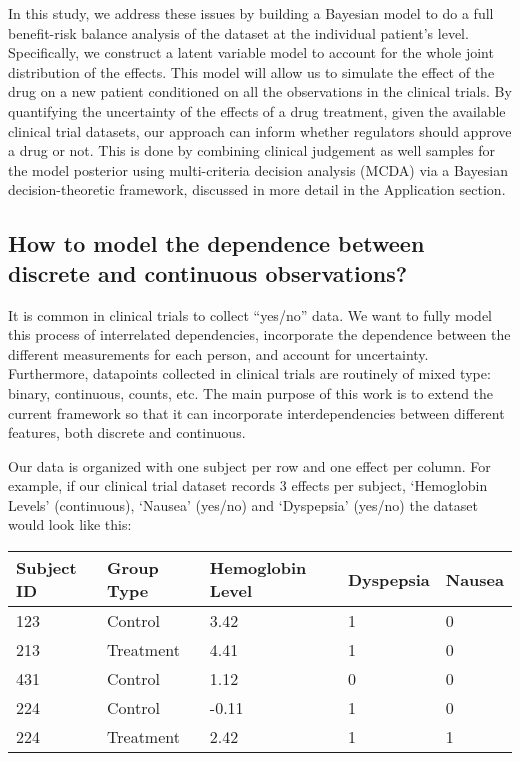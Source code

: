 \documentclass[11pt]{article}
\begin{document}
In this study, we address these issues by building a Bayesian model to
do a full benefit-risk balance analysis of the dataset at the individual
patient's level. Specifically, we construct a latent variable model to
account for the whole joint distribution of the effects. This model will
allow us to simulate the effect of the drug on a new patient conditioned
on all the observations in the clinical trials. By quantifying the
uncertainty of the effects of a drug treatment, given the available
clinical trial datasets, our approach can inform whether regulators
should approve a drug or not. This is done by combining clinical
judgement as well samples for the model posterior using multi-criteria
decision analysis (MCDA) via a Bayesian decision-theoretic framework,
discussed in more detail in the Application section.

\hypertarget{how-to-model-the-dependence-between-discrete-and-continuous-observations}{%
\subsection{How to model the dependence between discrete and continuous
observations?}\label{how-to-model-the-dependence-between-discrete-and-continuous-observations}}

It is common in clinical trials to collect ``yes/no'' data. We want to
fully model this process of interrelated dependencies, incorporate the
dependence between the different measurements for each person, and
account for uncertainty. Furthermore, datapoints collected in clinical
trials are routinely of mixed type: binary, continuous, counts, etc. The
main purpose of this work is to extend the current framework so that it
can incorporate interdependencies between different features, both
discrete and continuous.

Our data is organized with one subject per row and one effect per
column. For example, if our clinical trial dataset records 3 effects per
subject, `Hemoglobin Levels' (continuous), `Nausea' (yes/no) and
`Dyspepsia' (yes/no) the dataset would look like this:

\begin{longtable}[]{@{}lllll@{}}
\toprule
Subject ID & Group Type & Hemoglobin Level & Dyspepsia &
Nausea\tabularnewline
\midrule
\endhead
123 & Control & 3.42 & 1 & 0\tabularnewline
213 & Treatment & 4.41 & 1 & 0\tabularnewline
431 & Control & 1.12 & 0 & 0\tabularnewline
224 & Control & -0.11 & 1 & 0\tabularnewline
224 & Treatment & 2.42 & 1 & 1\tabularnewline
\bottomrule
\end{longtable}
\end{document}
